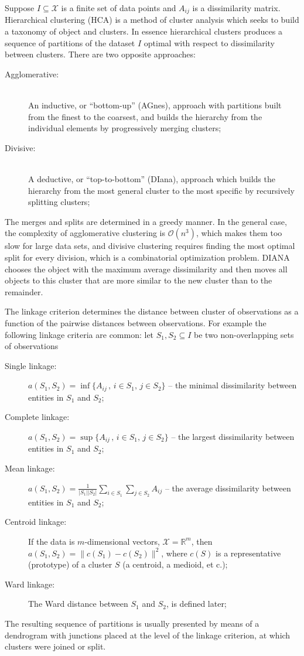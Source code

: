 \documentclass[a4paper]{article}
\newcommand{\Xcal}{\mathcal{X}}
\newcommand{\Real}{\mathbb{R}}
\begin{document}
Suppose $I\subseteq \Xcal$ is a finite set of data points and $A_{ij}$ is a dissimilarity
matrix. Hierarchical clustering (HCA) is a method of cluster analysis which seeks
to build a taxonomy of object and clusters. In essence hierarchical clusters produces
a sequence of partitions of the dataset $I$ optimal with respect to dissimilarity
between clusters. There are two opposite approaches:\begin{description}
    \item[Agglomerative:] \hfill \\
        An inductive, or ``bottom-up'' (AGnes), approach with partitions built from
        the finest to the coarsest, and builds the hierarchy from the individual
        elements by progressively merging clusters;
    \item[Divisive:] \hfill \\
        A deductive, or ``top-to-bottom'' (DIana), approach which builds the hierarchy
        from the most general cluster to the most specific by recursively splitting
        clusters;
\end{description}
The merges and splits are determined in a greedy manner. In the general case, the
complexity of agglomerative clustering is $\mathcal{O}(n^3)$, which makes them too
slow for large data sets, and divisive clustering requires finding the most optimal
split for every division, which is a combinatorial optimization problem. DIANA chooses
the object with the maximum average dissimilarity and then moves all objects to this
cluster that are more similar to the new cluster than to the remainder. 

The linkage criterion determines the distance between cluster of observations as
a function of the pairwise distances between observations. For example the following
linkage criteria are common: let $S_1, S_2\subseteq I$ be two non-overlapping sets
of observations\begin{description}
    \item[Single linkage:]
        $a(S_1, S_2) = \inf\{A_{ij}\,,\, i\in S_1,\,j\in S_2\}$
        -- the minimal dissimilarity between entities in $S_1$ and $S_2$;
    \item[Complete linkage:]
        $a(S_1, S_2) = \sup\{ A_{ij}\,,\, i\in S_1,\,j\in S_2\}$
        -- the largest dissimilarity between entities in $S_1$ and $S_2$;
    \item[Mean linkage:]
        $a(S_1, S_2) = \frac{1}{|S_1||S_2|} \sum_{i\in S_1}\sum_{j\in S_2} A_{ij}$
        -- the average dissimilarity between entities in $S_1$ and $S_2$;
    \item[Centroid linkage:]
        If the data is $m$-dimensional vectors, $\mathcal{X} = \Real^m$,
        then $a(S_1,S_2) = \|c(S_1) - c(S_2)\|^2$, where $c(S)$ is a representative
        (prototype) of a cluster $S$ (a centroid, a medioid, et c.);
    \item[Ward linkage:]
        The Ward distance between $S_1$ and $S_2$, is defined later;
\end{description}
The resulting sequence of partitions is usually presented by means of a dendrogram
with junctions placed at the level of the linkage criterion, at which clusters were
joined or split.
\end{document}
